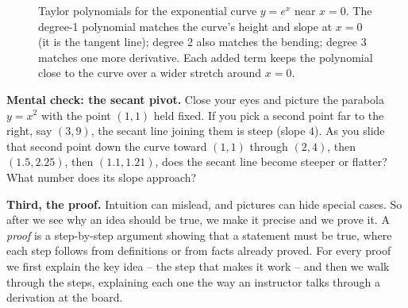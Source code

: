 \begin{figure}[htbp]
\centering
{}
\caption{Taylor polynomials for the exponential curve $y=e^x$ near $x=0$. The degree-1 polynomial
matches the curve's height and slope at $x=0$ (it is the tangent line); degree 2 also matches the
bending; degree 3 matches one more derivative. Each added term keeps the polynomial close to the
curve over a wider stretch around $x=0$.}
\label{ch00:taylor}
\end{figure}

\begin{recoverybox}
\textbf{Mental check: the secant pivot.} Close your eyes and picture the parabola $y = x^2$ with the point $(1,1)$ held fixed. If you pick a second point far to the right, say $(3,9)$, the secant line joining them is steep (slope $4$). As you slide that second point down the curve toward $(1,1)$ through $(2,4)$, then $(1.5, 2.25)$, then $(1.1, 1.21)$, does the secant line become steeper or flatter? What number does its slope approach?
\end{recoverybox}

\textbf{Third, the proof.} Intuition can mislead, and pictures can
hide special cases. So after we see why an idea should be true, we make it precise and we prove it.
A \emph{proof} is a step-by-step argument showing that a statement must be true, where each step
follows from definitions or from facts already proved. For every proof we first explain
the key idea -- the step that makes it work -- and then we walk through the
steps, explaining each one the way an instructor talks through a derivation at the board.

